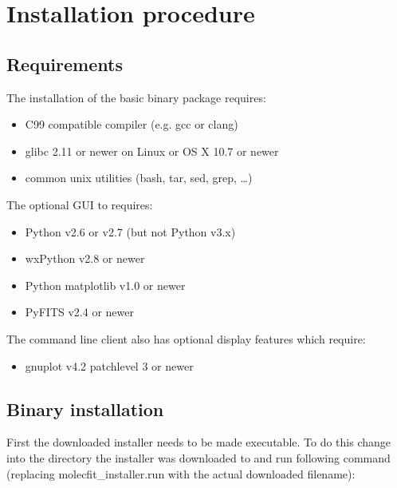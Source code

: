 \section{Installation procedure}\label{sec:installation}
\subsection{Requirements}\label{sec:requirements}
The installation of the basic \mf{} binary package requires:
\begin{itemize}
  \item
    C99 compatible compiler (e.g. gcc or clang)
  \item
    glibc 2.11 or newer on Linux or OS X 10.7 or newer
  \item
    common unix utilities (bash, tar, sed, grep, \ldots{})
\end{itemize}

The optional \ac{GUI} to \mf{} requires:

\begin{itemize}
  \item
    Python v2.6 or v2.7 (but not Python v3.x)
  \item
    wxPython v2.8 or newer
  \item
    Python matplotlib v1.0 or newer
  \item
    PyFITS v2.4 or newer
\end{itemize}

The command line client also has optional display features which
require:

\begin{itemize}
  \item gnuplot v4.2 patchlevel 3 or newer
\end{itemize}

\subsection{Binary installation}
\label{sec:installscript}

First the downloaded installer needs to be made executable. To do this change
into the directory the installer was downloaded to and run following command
(replacing molecfit\_installer.run with the actual downloaded filename):

